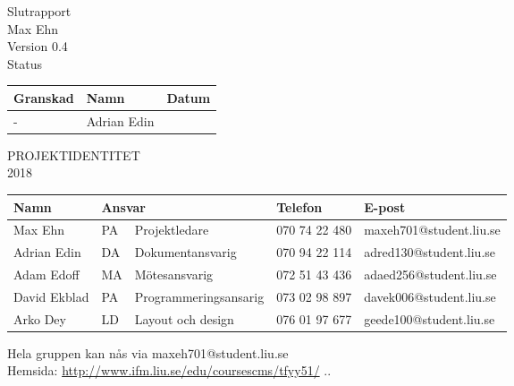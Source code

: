 \vspace*{\fill} 
\begin{center}
		\centering 
		\Huge  Slutrapport\\[0.3cm]
		\Large Max Ehn\\[0.2cm]
		\Large Version 0.4\\[4.2cm]

Status
\begin{table}[ht]
    \centering
    \begin{tabular}{|p{4cm}|p{4cm}|p{4cm}|} \hline
        Granskad & Namn & Datum \\ \hline
	    -  & Adrian Edin & \dateToUse \\\hline
    \end{tabular}
    \label{tab:dokumentstatus}
\end{table}

\end{center}
\vspace*{\fill}

\clearpage
\cfoot{\thepage} %

\begin{center}
		\centering 
		\vspace*{3cm}
		\Large  \textsc{PROJEKTIDENTITET} \\[0.3cm]
		\normalsize \textsc{2018}


\begin{table}[ht]
    \centering
    \begin{tabular}{|p{2.5cm}|p{0.5cm}|p{4cm}|p{2.5cm}|p{4cm}|}\hline \rowcolor{Gray}
 	Namn & \multicolumn{2}{|l|}{Ansvar} & Telefon & E-post \\\hline
	Max Ehn & PA & Projektledare & 070 74 22 480 & maxeh701@student.liu.se \\ \hline
    Adrian Edin & DA & Dokumentansvarig & 070 94 22 114 & adred130@student.liu.se\\ \hline
    Adam Edoff & MA & Mötesansvarig & 072 51 43 436 & adaed256@student.liu.se \\ \hline
    David Ekblad & PA & Programmeringsansarig & 073 02 98 897 & davek006@student.liu.se\\ \hline
    Arko Dey & LD & Layout och design & 076 01 97 677 & geede100@student.liu.se\\ \hline
    \end{tabular}
    \label{tab:medlemmar}
    
\end{table}
Hela gruppen kan nås via maxeh701@student.liu.se\\
Hemsida: \url{http://www.ifm.liu.se/edu/coursescms/tfyy51/} ..
\end{center}
\clearpage

